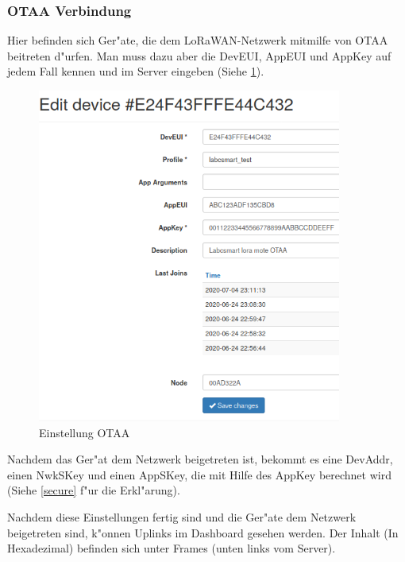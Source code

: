 \vspace{10cm}
\subsubsection{OTAA Verbindung}
Hier befinden sich Ger"ate, die dem LoRaWAN-Netzwerk mitmilfe von OTAA
beitreten d"urfen. Man muss dazu aber die DevEUI, AppEUI und AppKey auf
jedem Fall kennen und im Server eingeben (Siehe \ref{fig:otaa}). 
	\begin{figure}[h]
	\centering
	\includegraphics[width=10cm]{source/images/Labcsmart_otaa_gen}
	\caption{Einstellung OTAA\label{fig:otaa}}
\end{figure}
Nachdem das Ger"at dem Netzwerk beigetreten ist, bekommt es eine
DevAddr, einen NwkSKey und einen AppSKey, die mit Hilfe des AppKey
berechnet wird (Siehe \ref{secure} f"ur die Erkl"arung). 
\vspace{10cm}

Nachdem diese Einstellungen fertig sind und die Ger"ate dem Netzwerk
beigetreten sind, k"onnen Uplinks im Dashboard gesehen werden. Der
Inhalt (In Hexadezimal) befinden sich unter Frames (unten links vom
Server). 

